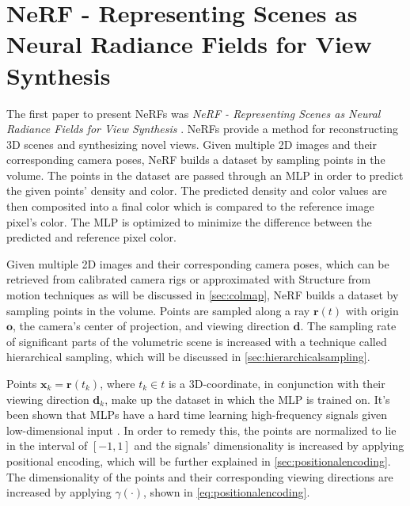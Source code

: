 \section[NeRF]{NeRF - Representing Scenes as Neural Radiance Fields for View Synthesis} \label{sec:nerf}
The first paper to present NeRFs was \textit{NeRF - Representing Scenes as Neural Radiance Fields for View Synthesis} \cite{mildenhall_nerf_2020}. NeRFs provide a method for reconstructing 3D scenes and synthesizing novel views. Given multiple 2D images and their corresponding camera poses, NeRF builds a dataset by sampling points in the volume. The points in the dataset are passed through an MLP in order to predict the given points' density and color. The predicted density and color values are then composited into a final color which is compared to the reference image pixel's color. The MLP is optimized to minimize the difference between the predicted and reference pixel color.


Given multiple 2D images and their corresponding camera poses, which can be retrieved from calibrated camera rigs or approximated with Structure from motion techniques as will be discussed in \autoref{sec:colmap}, NeRF builds a dataset by sampling points in the volume. Points are sampled along a ray $\pmb{r}(t)$ with origin $\textbf{o}$, the camera's center of projection, and viewing direction $\textbf{d}$. The sampling rate of significant parts of the volumetric scene is increased with a technique called hierarchical sampling, which will be discussed in \autoref{sec:hierarchicalsampling}.




Points $\pmb{x}_k = \pmb{r}(t_k)$, where $t_k \in t$ is a 3D-coordinate, in conjunction with their viewing direction $\pmb{d}_k$, make up the dataset in which the MLP is trained on. It's been shown that MLPs have a hard time learning high-frequency signals given low-dimensional input \cite{tancik_fourier_2020}. In order to remedy this, the points are normalized to lie in the interval of $[-1, 1]$ and the signals' dimensionality is increased by applying positional encoding, which will be further explained in \autoref{sec:positionalencoding}. The dimensionality of the points and their corresponding viewing directions are increased by applying $\gamma(\cdot)$, shown in \autoref{eq:positionalencoding}.

